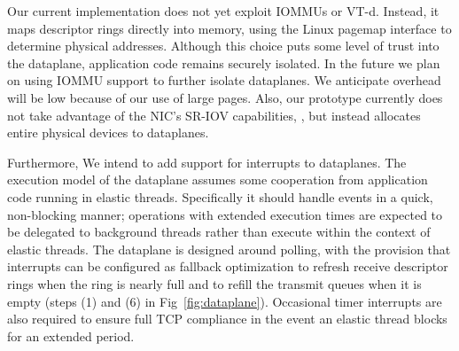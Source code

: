 \begin{comment}
  \myparagraph{Using interrupts as a fallback:} Some applications
  service requests that require extended intervals of compute time. We
  intend for these requests to be delegated to from elastic threads to
  background threads in order to ensure that elastic threads remain
  responsive.  However, \ix can also be modified to better tolerate
  unanticipated delays during application processing in elastic
  threads.  One option would be to use interrupts as a fallback
  mode. On the receive side, the NIC would fire an interrupt whenever
  the recieve descriptor ring is almost full. The dataplane could then
  move packets from the receive ring to a software structure, averting
  buffer underrun. On the transmit side, NIC would fire an interrupt
  whenever the transmit ring becomes empty so that it can be
  refilled. Such an interrupt would only need to be armed when there
  is additional transmit data pending. A desirable property of this
  approach is that neither interrupt would be triggered as long as
  elastic threads are sufficiently responsive, but if an elastic
  thread misbehaves, the \ix dataplane would be able to regain control
  and catch up on network processing.
\end{comment}


 Our current
implementation does not yet exploit IOMMUs or VT-d. Instead, it maps
descriptor rings directly into \ix memory, using the Linux pagemap
interface to determine physical addresses.  Although this choice puts
some level of trust into the \ix dataplane, application code remains
securely isolated. In the future we plan on using IOMMU support to
further isolate \ix dataplanes. We anticipate overhead will be low
because of our use of large pages.
Also, our prototype currently does not take advantage of the NIC's SR-IOV capabilities, , but instead allocates entire physical devices to dataplanes.

Furthermore, We intend to add support for interrupts to \ix dataplanes. The
execution model of the \ix dataplane assumes some cooperation from
application code running in elastic threads.  Specifically it should
handle events in a quick, non-blocking manner; operations with
extended execution times are expected to be delegated to background
threads rather than execute within the context of elastic threads.
The \ix dataplane is designed around polling, with the provision that
interrupts can be configured as fallback optimization to refresh
receive descriptor rings when the ring is nearly full and to refill
the transmit queues when it is empty (steps (1) and (6) in
Fig~\ref{fig:dataplane}). Occasional timer interrupts are also
required to ensure full TCP compliance in the event an elastic thread
blocks for an extended period.

